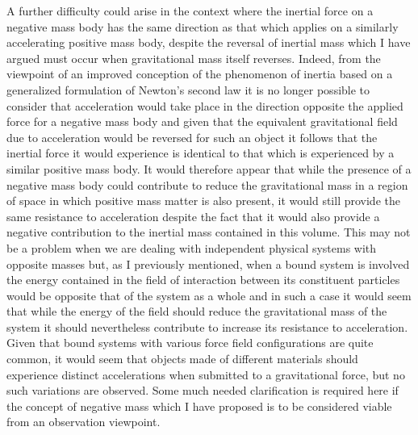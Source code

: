 \documentclass[notitlepage,12pt]{report}
\begin{document}
A further difficulty could arise in the context where the inertial force on a negative mass body has the same direction as that which applies on a similarly accelerating positive mass body, despite the reversal of inertial mass which I have argued must occur when gravitational mass itself reverses. Indeed, from the viewpoint of an improved conception of the phenomenon of inertia based on a generalized formulation of Newton's second law it is no longer possible to consider that acceleration would take place in the direction opposite the applied force for a negative mass body and given that the equivalent gravitational field due to acceleration would be reversed for such an object it follows that the inertial force it would experience is identical to that which is experienced by a similar positive mass body. It would therefore appear that while the presence of a negative mass body could contribute to reduce the gravitational mass in a region of space in which positive mass matter is also present, it would still provide the same resistance to acceleration despite the fact that it would also provide a negative contribution to the inertial mass contained in this volume. This may not be a problem when we are dealing with independent physical systems with opposite masses but, as I previously mentioned, when a bound system is involved the energy contained in the field of interaction between its constituent particles would be opposite that of the system as a whole and in such a case it would seem that while the energy of the field should reduce the gravitational mass of the system it should nevertheless contribute to increase its resistance to acceleration. Given that bound systems with various force field configurations are quite common, it would seem that objects made of different materials should experience distinct accelerations when submitted to a gravitational force, but no such variations are observed. Some much needed clarification is required here if the concept of negative mass which I have proposed is to be considered viable from an observation viewpoint.
\end{document}
